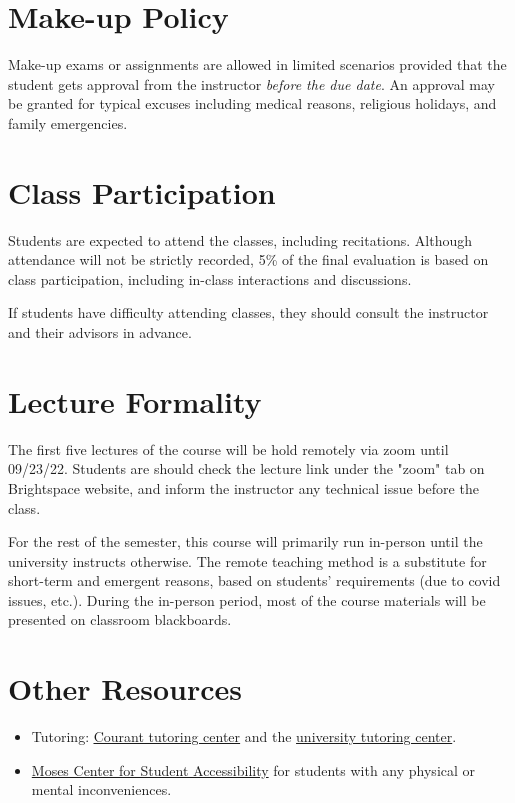 \documentclass[letterpaper]{inzane_syllabus} %
\begin{document}
\vspace{0.5cm}
\section{Make-up Policy}
Make-up exams or assignments are allowed in limited scenarios provided that the student gets approval from the instructor \emph{before the due date}. An approval may be granted for typical excuses including medical reasons, religious holidays, and family emergencies.

\vspace{0.5cm}
\section{Class Participation}
Students are expected to attend the classes, including recitations. Although attendance will not be strictly recorded, 5\% of the final evaluation is based on class participation, including in-class interactions and discussions. 

If students have difficulty attending classes, they should consult the instructor and their advisors in advance.

\vspace{0.5cm}
\section{Lecture Formality}
The first five lectures of the course will be hold remotely via zoom until 09/23/22. Students are should check the lecture link under the "zoom" tab on Brightspace website, and inform the instructor any technical issue before the class. 

For the rest of the semester, this course will primarily run in-person until the university instructs otherwise. The remote teaching method is a substitute for short-term and emergent reasons, based on students' requirements (due to covid issues, etc.). During the in-person period, most of the course materials will be presented on classroom blackboards.

\vspace{0.5cm}
\section{Other Resources}
\begin{itemize}
  \item Tutoring: \href{https://math.nyu.edu/dynamic/undergrad/ba-cas/tutoring/}{\underline{Courant tutoring center}} and the \href{https://www.nyu.edu/students/academic-services/undergraduate-advisement/academic-resource-center/tutoring-and-learning.html}{university tutoring center}.
  \item \href{https://www.nyu.edu/about/leadership-university-administration/office-of-the-president/office-of-the-provost/university-life/office-of-studentaffairs/student-health-center/moses-center-for-student-accessibility.html}{Moses Center for Student Accessibility} for students with any physical or mental inconveniences.
\end{itemize}
\end{document}
